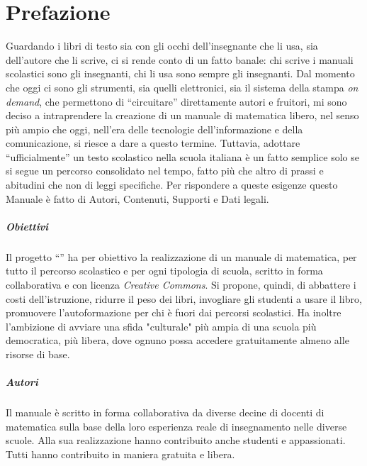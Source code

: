 \pagestyle{matc3page}
\chapter*{Prefazione}
Guardando i libri di testo sia con gli occhi dell'insegnante che li usa, sia dell'autore che li scrive, ci si rende
conto di un fatto banale: chi scrive i manuali scolastici sono gli insegnanti, chi li usa sono sempre gli
insegnanti. Dal momento che oggi ci sono gli strumenti, sia quelli elettronici, sia il sistema della stampa \textit{on demand},
che permettono di ``circuitare'' direttamente autori e fruitori, mi sono deciso a intraprendere la
creazione di un manuale di matematica libero, nel senso più ampio che oggi, nell'era delle tecnologie
dell'informazione e della comunicazione, si riesce a dare a questo termine. Tuttavia, adottare ``ufficialmente'' un
testo scolastico nella scuola italiana è un fatto semplice solo se si segue un percorso consolidato nel tempo,
fatto più che altro di prassi e abitudini che non di leggi specifiche. Per rispondere a queste esigenze questo
Manuale è fatto di Autori, Contenuti, Supporti e Dati legali.

\paragraph{Obiettivi} Il progetto ``\serie'' ha per obiettivo la realizzazione di un manuale di matematica, per
tutto il percorso scolastico e per ogni tipologia di scuola, scritto in forma collaborativa e con licenza \textit{Creative
Commons}. Si propone, quindi, di abbattere i costi dell'istruzione, ridurre il peso dei libri, invogliare gli
studenti a usare il libro, promuovere l'autoformazione
per chi è fuori dai percorsi scolastici. Ha inoltre l'ambizione di avviare una sfida "culturale" più
ampia di una scuola più democratica, più libera, dove ognuno possa accedere gratuitamente almeno alle
risorse di base.

\paragraph{Autori} Il manuale è scritto in forma collaborativa da diverse decine di docenti di matematica sulla base
della loro esperienza reale di insegnamento nelle diverse scuole. Alla sua realizzazione hanno contribuito
anche studenti e appassionati. Tutti hanno contribuito in maniera gratuita e libera.


